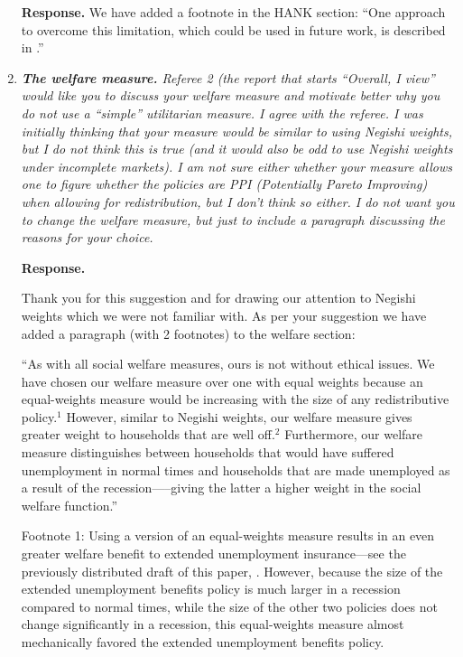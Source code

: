 \documentclass[12pt,letterpaper,english]{article}
\begin{document}
\begin{enumerate}
\noindent \textbf{Response.} We have added a footnote in the HANK section: ``One approach to overcome this limitation, which could be used in future work, is described in \cite{bmpMITshocks}.''

\item \textit{\textbf{The welfare measure.} Referee 2 (the report that starts ``Overall, I view'' would like you to discuss your welfare measure and motivate better why you do not use a ``simple'' utilitarian measure. I agree with the referee. I was initially thinking that	your measure would be similar to using Negishi weights, but I do not think this is true (and it would also be odd to use Negishi weights under incomplete markets). I am not sure either whether your measure allows one to figure whether the policies are PPI (Potentially Pareto Improving) when allowing for redistribution, but I don't think so either. I do not want you to change the welfare measure, but just to include a paragraph discussing the reasons for your choice.}
	
\noindent \textbf{Response.} 

Thank you for this suggestion and for drawing our attention to Negishi weights which we were not familiar with. As per your suggestion we have added a paragraph (with 2 footnotes) to the welfare section:

``As with all social welfare measures, ours is not without ethical issues.  We have chosen our welfare measure over one with equal weights because an equal-weights measure would be increasing with the size of any redistributive policy.$^1$ However, similar to Negishi weights, our welfare measure gives greater weight to households that are well off.$^2$  Furthermore, our welfare measure distinguishes between households that would have suffered unemployment in normal times and households that are made unemployed as a result of the recession—--giving the latter a higher weight in the social welfare function.''

Footnote 1: Using a version of an equal-weights measure results in an even greater welfare benefit to extended unemployment insurance---see the previously distributed draft of this paper, \cite{carroll2023welfare}.  However, because the size of the extended unemployment benefits policy is much larger in a recession compared to normal times, while the size of the other two policies does not change significantly in a recession, this equal-weights measure almost mechanically favored the extended unemployment benefits policy.


\end{enumerate}
\end{document}
